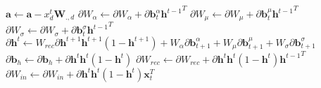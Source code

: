 \documentclass{article} %
\begin{document}
\begin{algorithm}
\begin{algorithmic}
\Else
	\State $\mathbf{a} \gets \mathbf{a} - x^{t}_d \mathbf{W}_{.,d}$
\EndIf
\EndFor
\State $\partial W_{\alpha} \gets \partial W_{\alpha} + \partial \mathbf{b}^{\alpha}_{t}{\mathbf{h}^{t-1}}^T$
\State $\partial W_{\mu} \gets \partial W_{\mu} + \partial \mathbf{b}^{\mu}_{t}{\mathbf{h}^{t-1}}^T$
\State $\partial W_{\sigma} \gets \partial W_{\sigma} + \partial \mathbf{b}^{\sigma}_{t}{\mathbf{h}^{t-1}}^T$
\State $\partial \mathbf{h}^{t} \gets W_{rec}\partial  \mathbf{h}^{t+1}\mathbf{h}^{t+1}(1-\mathbf{h}^{t+1}) + W_{\alpha} \partial \mathbf{b}^{\alpha}_{t+1} + W_{\mu} \partial \mathbf{b}^{\mu}_{t+1} + W_{\sigma} \partial \mathbf{b}^{\sigma}_{t+1}$
\State $\partial \mathbf{b}_h \gets \partial \mathbf{b}_h + \partial \mathbf{h}^{t} \mathbf{h}^{t} (1-\mathbf{h}^{t})$
\State $\partial W_{rec} \gets \partial W_{rec} + \partial \mathbf{h}^{t} \mathbf{h}^{t} (1-\mathbf{h}^{t}){\mathbf{h}^{t-1}}^T$
\State $\partial W_{in} \gets \partial W_{in} + \partial \mathbf{h}^{t} \mathbf{h}^{t} (1-\mathbf{h}^{t})\mathbf{x}_t^T$
\EndFor
\end{algorithmic}
\end{algorithm}






\end{document}
